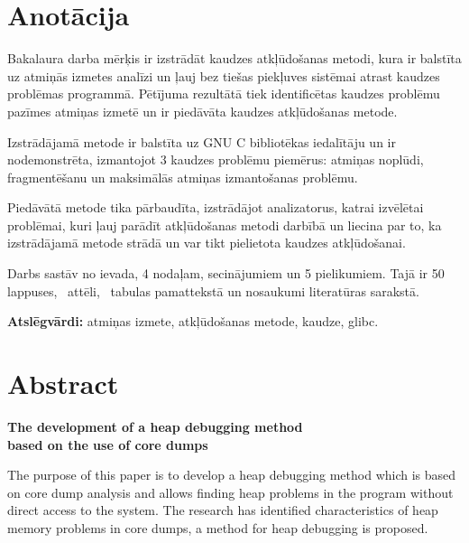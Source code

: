 \chapter*{Anotācija}
\thispagestyle{empty}

Bakalaura darba mērķis ir izstrādāt kaudzes atkļūdošanas metodi, kura ir balstīta uz atmiņās izmetes analīzi un ļauj bez tiešas piekļuves sistēmai atrast kaudzes problēmas programmā.
Pētījuma rezultātā tiek identificētas kaudzes problēmu pazīmes atmiņas izmetē un ir piedāvāta kaudzes atkļūdošanas metode.

Izstrādājamā metode ir balstīta uz GNU C bibliotēkas iedalītāju un ir nodemonstrēta, izmantojot 3 kaudzes problēmu piemērus: atmiņas noplūdi, fragmentēšanu un maksimālās atmiņas izmantošanas problēmu.

Piedāvātā metode tika pārbaudīta, izstrādājot analizatorus, katrai izvēlētai problēmai, kuri ļauj parādīt atkļūdošanas metodi darbībā un liecina par to, ka izstrādājamā metode strādā un var tikt pielietota kaudzes atkļūdošanai.



Darbs sastāv no ievada, 4 nodaļam, secinājumiem un 5 pielikumiem. Tajā ir 50 lappuses, \totfig\ attēli, \tottab\ tabulas pamattekstā un  nosaukumi literatūras sarakstā.

\textbf{Atslēgvārdi:} atmiņas izmete, atkļūdošanas metode, kaudze, glibc.

\newpage

\chapter*{Abstract}
\begin{center}
\linespread{1.2}
\vspace{-0.3cm}
\large \textbf {The development of a heap debugging method \protect\\  based on the use of core dumps}
\end{center}

The purpose of this paper is to develop a heap debugging method which is based on core dump analysis and allows finding heap problems in the program without direct access to the system.
The research has identified characteristics of heap memory problems in core dumps, a method for heap debugging is proposed.

